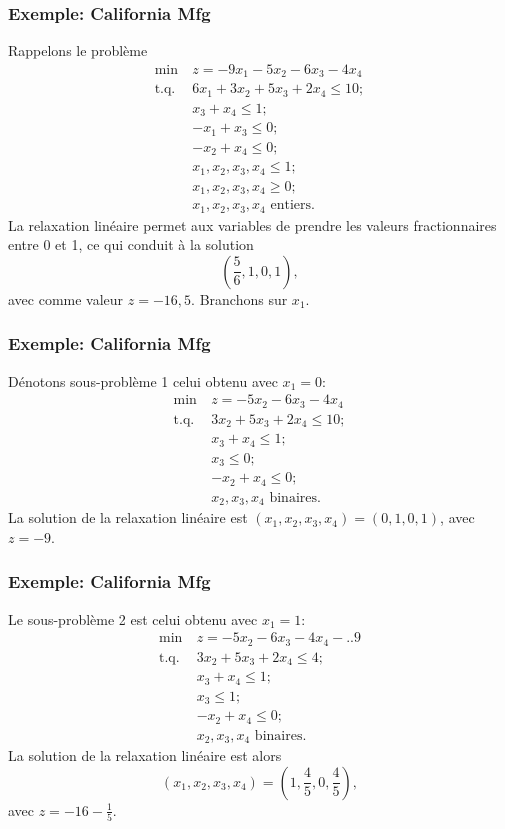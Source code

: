 \documentclass[usepdftitle=false, aspectratio=169]{beamer}
\def\st{\mbox{t.q. }}
\begin{document}
\begin{frame}
\frametitle{Exemple: California Mfg}

Rappelons le problème
\begin{align*}
\min\ & z = -9x_1 -5x_2 -6x_3 -4x_4 \\
\st & 6x_1 + 3x_2 + 5x_3 + 2x_4 \leq 10; \\
& x_3 + x_4 \leq 1; \\
& -x_1 + x_3 \leq 0; \\
& -x_2 + x_4 \leq 0; \\
& x_1, x_2, x_3, x_4 \leq 1; \\
& x_1, x_2, x_3, x_4 \geq 0; \\
& x_1, x_2, x_3, x_4 \mbox{ entiers}.
\end{align*}
La relaxation linéaire permet aux variables de prendre les valeurs fractionnaires entre 0 et 1, ce qui conduit à la solution
\[
\left( \frac{5}{6}, 1, 0, 1 \right),
\]
avec comme valeur $z = -16,5$.
Branchons sur $x_1$.

\end{frame}

\begin{frame}
\frametitle{Exemple: California Mfg}

Dénotons sous-problème 1 celui obtenu avec $x_1 = 0$:
\begin{align*}
\min\ & z = -5x_2 -6x_3 -4x_4 \\
\st & 3x_2 + 5x_3 + 2x_4 \leq 10; \\
& x_3 + x_4 \leq 1; \\
& x_3 \leq 0; \\
& -x_2 + x_4 \leq 0; \\
& x_2, x_3, x_4 \mbox{ binaires}.
\end{align*}
La solution de la relaxation linéaire est $(x_1, x_2, x_3, x_4) = (0,1,0,1)$, avec $z = -9$.

\end{frame}

\begin{frame}
\frametitle{Exemple: California Mfg}

Le sous-problème 2 est celui obtenu avec $x_1 = 1$:
\begin{align*}
\min\ & z = -5x_2 -6x_3 -4x_4 -.. 9 \\
\st & 3x_2 + 5x_3 + 2x_4 \leq 4; \\
& x_3 + x_4 \leq 1; \\
& x_3 \leq 1; \\
& -x_2 + x_4 \leq 0; \\
& x_2, x_3, x_4 \mbox{ binaires}.
\end{align*}
La solution de la relaxation linéaire est alors
\[
(x_1, x_2, x_3, x_4) = \left( 1, \frac{4}{5},0, \frac{4}{5} \right),
\]
avec $z = -16-\frac{1}{5}$.

\end{frame}
\end{document}
